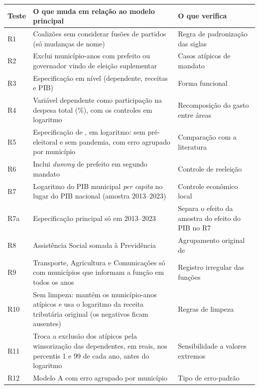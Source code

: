 \begin{quadro}[htbp]
\caption{Testes de robustez}\label{qua:robustez}
\centering
\footnotesize
\begin{tabular}{|>{\raggedright\arraybackslash}p{1.0cm}|>{\raggedright\arraybackslash}p{8.0cm}|>{\raggedright\arraybackslash}p{5.0cm}|}
\hline
\textbf{Teste} & \textbf{O que muda em relação ao modelo principal} & \textbf{O que verifica} \\ \hline
R1 & Coalizões sem considerar fusões de partidos (só mudanças de nome) & Regra de padronização das siglas \\ \hline
R2 & Exclui município-anos com prefeito ou governador vindo de eleição suplementar & Casos atípicos de mandato \\ \hline
R3 & Especificação em nível (dependente, receitas e PIB) & Forma funcional \\ \hline
R4 & Variável dependente como participação na despesa total (\%), com os controles em logaritmo & Recomposição do gasto entre áreas \\ \hline
R5 & Especificação de \textcite{sakurai2009}, em logaritmo: sem pré-eleitoral e sem pandemia, com erro agrupado por município & Comparação com a literatura \\ \hline
R6 & Inclui \textit{dummy} de prefeito em segundo mandato & Controle de reeleição \\ \hline
R7 & Logaritmo do PIB municipal \textit{per capita} no lugar do PIB nacional (amostra 2013--2023) & Controle econômico local \\ \hline
R7a & Especificação principal só em 2013--2023 & Separa o efeito da amostra do efeito do PIB no R7 \\ \hline
R8 & Assistência Social somada à Previdência & Agrupamento original de \textcite{sakurai2009} \\ \hline
R9 & Transporte, Agricultura e Comunicações só com municípios que informam a função em todos os anos & Registro irregular das funções \\ \hline
R10 & Sem limpeza: mantém os município-anos atípicos e usa o logaritmo da receita tributária original (os negativos ficam ausentes) & Regras de limpeza \\ \hline
R11 & Troca a exclusão dos atípicos pela winsorização das dependentes, em reais, nos percentis 1 e 99 de cada ano, antes do logaritmo & Sensibilidade a valores extremos \\ \hline
R12 & Modelo A com erro agrupado por município & Tipo de erro-padrão \\ \hline

\end{tabular}
\end{quadro}
